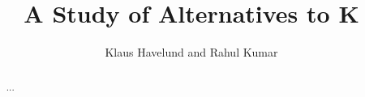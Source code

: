 \documentclass{llncs}
\title{A Study of Alternatives to K}
\author{Klaus Havelund and Rahul Kumar}
\institute{
  Jet Propulsion Laboratory\\
  California Institute of Technology\\
  California, USA
}
\begin{document}
\maketitle

\begin{abstract}
...
\end{abstract}






\appendix
%
\end{document}
